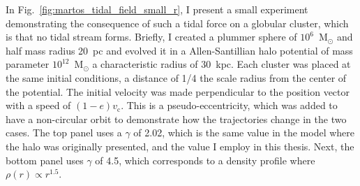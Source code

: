             In Fig.~\ref{fig:martos_tidal_field_small_r}, I present a small experiment demonstrating the consequence of such a tidal force on a globular cluster, which is that no tidal stream forms. Briefly, I created a plummer sphere of $10^6$~M$_\odot$ and half mass radius 20~pc and evolved it in a Allen-Santillian halo potential of mass parameter $10^{12}$~M$_\odot$ a characteristic radius of $30$~kpc. Each cluster was placed at the same initial conditions, a distance of 1/4 the scale radius from the center of the potential. The initial velocity was made perpendicular to the position vector with a speed of $(1-e)v_\textrm{c}$. This is a pseudo-eccentricity, which was added to have a non-circular orbit to demonstrate how the trajectories change in the two cases. The top panel uses a $\gamma$ of 2.02, which is the same value in the model where the halo was originally presented, and the value I employ in this thesis. Next, the bottom panel uses $\gamma$ of 4.5, which corresponds to a density profile where $\rho(r) \propto r^{1.5}$. 

